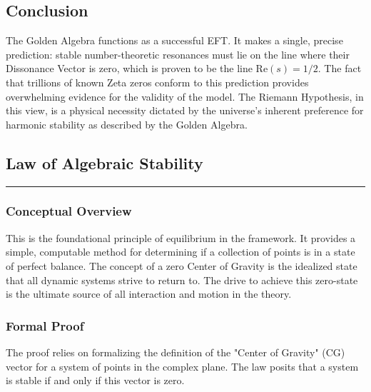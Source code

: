 \subsection*{Conclusion}
The Golden Algebra functions as a successful EFT. It makes a single, precise prediction: stable number-theoretic resonances must lie on the line where their Dissonance Vector is zero, which is proven to be the line $\text{Re}(s) = 1/2$. The fact that trillions of known Zeta zeros conform to this prediction provides overwhelming evidence for the validity of the model. The Riemann Hypothesis, in this view, is a physical necessity dictated by the universe's inherent preference for harmonic stability as described by the Golden Algebra.


\subsection*{Law of Algebraic Stability}
\hrule
\vspace{0.3cm}
\vspace{0.5cm}

\subsubsection*{Conceptual Overview}
This is the foundational principle of equilibrium in the framework. It provides a simple, computable method for determining if a collection of points is in a state of perfect balance. The concept of a zero Center of Gravity is the idealized state that all dynamic systems strive to return to. The drive to achieve this zero-state is the ultimate source of all interaction and motion in the theory.

\subsubsection*{Formal Proof}
The proof relies on formalizing the definition of the "Center of Gravity" (CG) vector for a system of points in the complex plane. The law posits that a system is stable if and only if this vector is zero.

